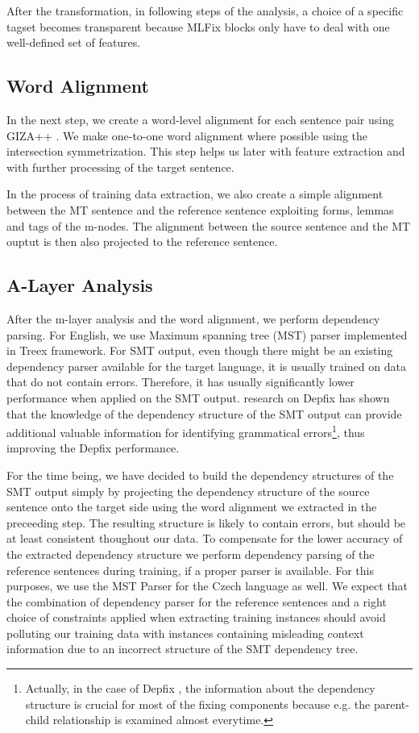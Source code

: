 After the transformation, in following steps of the analysis, a choice
of a specific tagset becomes transparent because MLFix blocks only
have to deal with one well-defined set of features.

\subsection{Word Alignment}

In the next step, we create a word-level alignment for each sentence pair
using GIZA++ \citep{och:ney:2000}. We make one-to-one word alignment where possible
using the intersection symmetrization. This step helps us later with feature extraction
and with further processing of the target sentence.

In the process of training data extraction, we also create a simple alignment between
the MT sentence and the reference sentence exploiting forms, lemmas and tags
of the m-nodes. The alignment between the source sentence and the MT ouptut is then also
projected to the reference sentence.

\subsection{A-Layer Analysis}

After the m-layer analysis and the word alignment, we perform dependency parsing.
For English, we use Maximum spanning tree (MST) parser \citep{mcdonald:pereira:ribarov:hajic:2005}
implemented in Treex framework. For SMT output, even though there might
be an existing dependency parser available for the target language, it is usually
trained on data that do not contain errors. Therefore, it has usually significantly
lower performance when applied on the SMT output.  research on Depfix has shown
that the knowledge of the dependency structure of the SMT output can provide additional
valuable information for identifying grammatical errors\footnote{Actually, in the case of Depfix
, the information about the dependency structure is crucial for most of the fixing components
because e.g. the parent-child relationship is examined almost everytime.}, thus improving
the Depfix performance.

For the time being, we have decided to build the dependency structures of the SMT output simply
by projecting the dependency structure of the source sentence onto the target side
using the word alignment we extracted in the preceeding step. The resulting structure
is likely to contain errors, but should be at least consistent thoughout our data.
To compensate for the lower accuracy of the extracted dependency structure we perform
dependency parsing of the reference sentences during training, if a proper parser
is available. For this purposes, we use the MST Parser for the Czech language as well.
We expect that the combination of dependency parser for the reference sentences and
a right choice of constraints applied when extracting training instances should
avoid polluting our training data with instances containing misleading context information
due to an incorrect structure of the SMT dependency tree.

